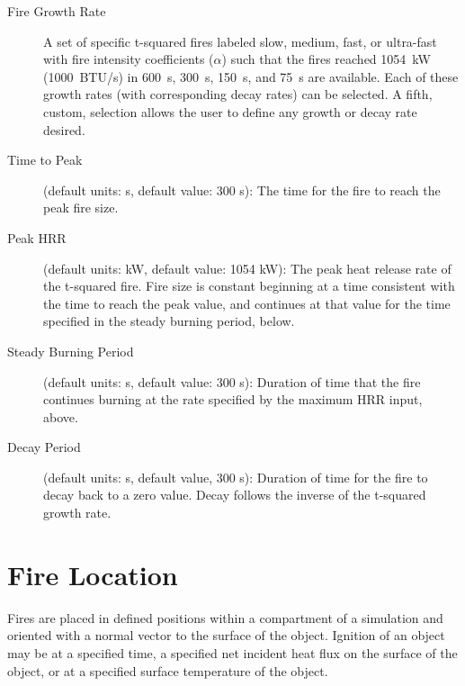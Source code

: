 \begin{description}
\item[Fire Growth Rate] A set of specific t-squared fires labeled slow, medium, fast, or ultra-fast with fire intensity coefficients ($\alpha$) such that the fires reached 1054~kW (1000~BTU/s) in 600~s, 300~s, 150~s, and 75~s are available.  Each of these growth rates (with corresponding decay rates) can be selected. A fifth, custom, selection allows the user to define any growth or decay rate desired.

\item[Time to Peak] (default units: s, default value: 300 s): The time for the fire to reach the peak fire size.

\item[Peak HRR] (default units: kW, default value: 1054 kW): The peak heat release rate of the t-squared fire.  Fire size is constant beginning at a time consistent with the time to reach the peak value,   and continues at that value for the time specified in the steady burning period, below.

\item[Steady Burning Period] (default units: s, default value: 300 s): Duration of time that the fire continues burning at the rate specified by the maximum HRR input, above.

\item[Decay Period] (default units: s, default value, 300 s): Duration of time for the fire to decay back to a zero value.  Decay follows the inverse of the t-squared growth rate.
\end{description}

\section{Fire Location}

Fires  are placed in defined positions within a compartment of a simulation and oriented with a normal vector to the surface of the object.  Ignition of an object may be at a specified time, a specified net incident heat flux on the surface of the object, or at a specified surface temperature of the object.

